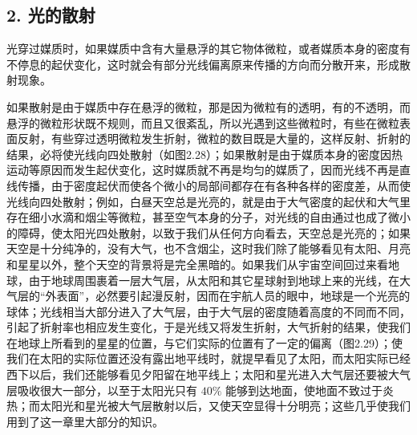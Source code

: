 \subsection{2. 光的散射}

光穿过媒质时，如果媒质中含有大量悬浮的其它物体微粒，或者媒质本身的密度有不停息的起伏变化，这时就会有部分光线偏离原来传播的方向而分散开来，形成散射现象。

如果散射是由于媒质中存在悬浮的微粒，那是因为微粒有的透明，有的不透明，而悬浮的微粒形状既不规则，而且又很紊乱，所以光遇到这些微粒时，有些在微粒表面反射，有些穿过透明微粒发生折射，微粒的数目既是大量的，这样反射、折射的结果，必将使光线向四处散射（如图2.28）；如果散射是由于媒质本身的密度因热运动等原因而发生起伏变化，这时媒质就不再是均匀的媒质了，因而光线不再是直线传播，由于密度起伏而使各个微小的局部间都存在有各种各样的密度差，从而使光线向四处散射；例如，白昼天空总是光亮的，就是由于大气密度的起伏和大气里存在细小水滴和烟尘等微粒，甚至空气本身的分子，对光线的自由通过也成了微小的障碍，使太阳光四处散射，以致于我们从任何方向看去，天空总是光亮的；如果天空是十分纯净的，没有大气，也不含烟尘，这时我们除了能够看见有太阳、月亮和星星以外，整个天空的背景将是完全黑暗的。如果我们从宇宙空间回过来看地球，由于地球周围裹着一层大气层，从太阳和其它星球射到地球上来的光线，在大气层的``外表面''，必然要引起漫反射，因而在宇航人员的眼中，地球是一个光亮的球体；光线相当大部分进入了大气层，由于大气层的密度随着高度的不同而不同，引起了折射率也相应发生变化，于是光线又将发生折射，大气折射的结果，使我们在地球上所看到的星星的位置，与它们实际的位置有了一定的偏离（图2.29）；使我们在太阳的实际位置还没有露出地平线时，就提早看见了太阳，而太阳实际已经西下以后，我们还能够看见夕阳留在地平线上；太阳和星光进入大气层还要被大气层吸收很大一部分，以至于太阳光只有
\(40\%\)
能够到达地面，使地面不致过于炎热；而太阳光和星光被大气层散射以后，又使天空显得十分明亮；这些几乎使我们用到了这一章里大部分的知识。

